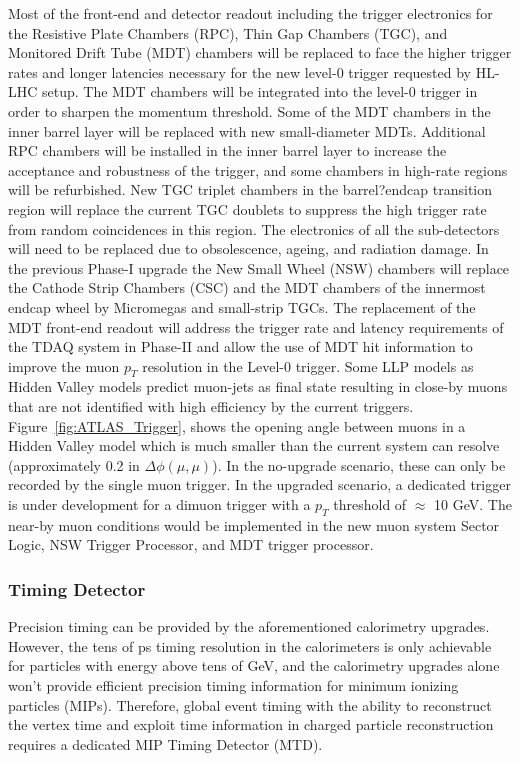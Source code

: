 Most of the front-end and detector readout including the trigger electronics for the Resistive Plate Chambers (RPC), Thin Gap Chambers (TGC),
and Monitored Drift Tube (MDT) chambers will be replaced to face
the higher trigger rates and longer latencies necessary for the new level-0 trigger requested by HL-LHC setup. 
The MDT chambers will be integrated into the level-0 trigger in order to sharpen the momentum threshold. Some of the MDT chambers in the inner barrel layer will be replaced with new small-diameter MDTs. 
Additional RPC chambers will be installed in the inner barrel layer to increase the
acceptance and robustness of the trigger, and some chambers in high-rate regions will be
refurbished. 
New TGC triplet chambers in the barrel?endcap transition region will replace the current TGC doublets to suppress the high trigger rate from random
coincidences in this region. 
The electronics of all the sub-detectors will need to be replaced due to obsolescence, ageing, and radiation
damage. 
In the previous Phase-I upgrade the New Small Wheel (NSW) chambers will replace the Cathode Strip Chambers (CSC) and
the MDT chambers of the innermost endcap wheel by Micromegas and small-strip TGCs.
The replacement of the MDT front-end readout will address the trigger rate
and latency requirements of the TDAQ system in Phase-II and allow the use of MDT hit
information to improve the muon $p_T$ resolution in the Level-0 trigger.
Some LLP models as Hidden Valley models predict muon-jets  as final state  resulting in close-by muons that are not identified with high efficiency by the current triggers.
Figure~\ref{fig:ATLAS_Trigger}, shows the opening angle between muons in a Hidden Valley model which
is much smaller than the current system can resolve (approximately 0.2 in $\Delta\phi(\mu,\mu)$). In
the no-upgrade scenario, these can only be recorded by the single muon trigger. In the upgraded scenario,
a dedicated trigger is under development for a dimuon trigger with a $p_T$
threshold of $\approx$ 10 GeV. The near-by muon conditions would be implemented in the new muon system
Sector Logic, NSW Trigger Processor, and MDT trigger processor.




\subsubsection{Timing Detector} \label{sec:upgradetiming}

Precision timing can be provided by the aforementioned calorimetry upgrades. 
However, the tens of ps timing resolution in the calorimeters is only achievable for particles with energy above tens of GeV, and the calorimetry upgrades alone won't provide efficient precision timing information for minimum ionizing particles (MIPs). 
Therefore, global event timing with the ability to reconstruct the vertex time and exploit time information in charged particle reconstruction requires a dedicated MIP Timing Detector (MTD). 

